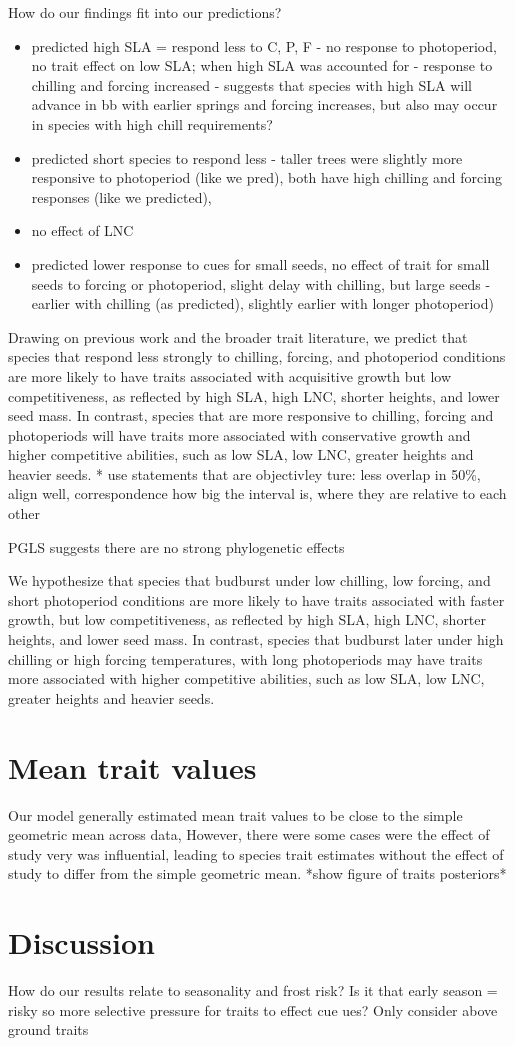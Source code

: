 \documentclass{article}\usepackage[]{graphicx}\usepackage[]{color}
\begin{document}
How do our findings fit into our predictions?
\begin {itemize}
\item predicted high SLA = respond less to C, P, F - no response to photoperiod, no trait effect on low SLA; when high SLA was accounted for - response to chilling and forcing increased - suggests that species with high SLA will advance in bb with earlier springs and forcing increases, but also may occur in species with high chill requirements?
\item predicted short species to respond less - taller trees were slightly more responsive to photoperiod (like we pred), both have high chilling and forcing responses  (like we predicted), 
\item no effect of LNC
\item predicted lower response to cues for small seeds, no effect of trait for small seeds to forcing or photoperiod, slight delay with chilling, but large seeds - earlier with chilling (as predicted), slightly earlier with longer photoperiod)

\end{itemize}
Drawing on previous work and the broader trait literature, we predict that species that respond less strongly to chilling, forcing, and photoperiod conditions are more likely to have traits associated with acquisitive growth but low competitiveness, as reflected by high SLA, high LNC, shorter heights, and lower seed mass. In contrast, species that are more responsive to chilling, forcing and photoperiods will have traits more associated with conservative growth and higher competitive abilities, such as low SLA, low LNC, greater heights and heavier seeds. 
* use statements that are objectivley ture: less overlap in 50\%, align well, correspondence 
how big the interval is, where they are relative to each other

PGLS suggests there are no strong phylogenetic effects

 We hypothesize that species that budburst under low chilling, low forcing, and short photoperiod conditions are more likely to have traits associated with faster growth, but low competitiveness, as reflected by high SLA, high LNC, shorter heights, and lower seed mass. In contrast, species that budburst later under high chilling or high forcing temperatures, with long photoperiods  may have traits more associated with higher competitive abilities, such as low SLA, low LNC, greater heights and heavier seeds. 

\section{Mean trait values}
Our model generally estimated mean trait values to be close to the simple geometric mean across data, However, there were some cases were the effect of study very was influential, leading to species trait estimates without the effect of study to differ from the simple geometric mean. *show figure of traits posteriors*  
 
\section{Discussion}

How do our results relate to seasonality and frost risk? Is it that early season = risky so more selective pressure for traits to effect cue ues?
Only consider above ground traits

\pagebreak
% 

\end{document}
